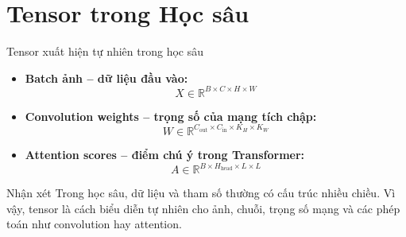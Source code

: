 \section{Tensor trong Học sâu}

\begin{frame}{Tensor xuất hiện tự nhiên trong học sâu}
    \begin{itemize}
        \item \textbf{Batch ảnh -- dữ liệu đầu vào:}
        \[
            X \in \mathbb{R}^{B \times C \times H \times W}
        \]

        \item \textbf{Convolution weights -- trọng số của mạng tích chập:}
        \[
            W \in \mathbb{R}^{C_{\mathrm{out}} \times C_{\mathrm{in}} \times K_H \times K_W}
        \]

        \item \textbf{Attention scores -- điểm chú ý trong Transformer:}
        \[
            A \in \mathbb{R}^{B \times H_{\mathrm{head}} \times L \times L}
        \]
    \end{itemize}

    \vfill

    \begin{block}{Nhận xét}
        Trong học sâu, dữ liệu và tham số thường có cấu trúc nhiều chiều.
        Vì vậy, tensor là cách biểu diễn tự nhiên cho ảnh, chuỗi, trọng số mạng và các phép toán như convolution hay attention.
    \end{block}
\end{frame}


